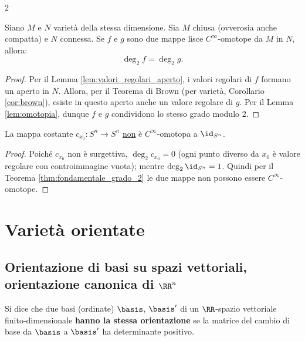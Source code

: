 \begin{multicols*}{2}
    \begin{theorem} \label{thm:fondamentale_grado_2}
        Siano $M$ e $N$ varietà della stessa dimensione. Sia $M$ chiusa (ovverosia
        anche compatta)
        e $N$ connessa. Se $f$ e $g$ sono due mappe lisce $C^\infty$-omotope da $M$ in $N$,
        allora:
        \[
            \boxed{\deg_2 f = \deg_2 g.}
        \]
    \end{theorem}

    \begin{proof}
        Per il Lemma \ref{lem:valori_regolari_aperto}, i valori regolari di $f$ formano un aperto in $N$. Allora, per il Teorema
        di Brown (per varietà, Corollario \ref{cor:brown}), esiste in questo
        aperto anche un valore regolare di $g$. Per il Lemma \ref{lem:omotopia},
        dunque $f$ e $g$ condividono lo stesso grado modulo $2$.
    \end{proof}

    \begin{corollary}
        La mappa costante $c_{x_0} : S^n \to S^n$ \underline{non} è
        $C^\infty$-omotopa a $\id_{S^n}$.
    \end{corollary}

    \begin{proof}
        Poiché $c_{x_0}$ non è surgettiva, $\deg_2 c_{x_0} = 0$ (ogni punto diverso da $x_0$ è
        valore regolare con controimmagine vuota); mentre
        $\deg_2 \id_{S^n} = 1$. Quindi per il Teorema \ref{thm:fondamentale_grado_2}
        le due mappe non possono essere $C^\infty$-omotope.
    \end{proof}

    \section{Varietà orientate}

    \subsection{Orientazione di basi su spazi vettoriali, orientazione canonica di \texorpdfstring{$\RR^n$}{ℝⁿ}}

    \begin{definition}
        Si dice che due basi (ordinate) $\basis$, $\basis'$ di un $\RR$-spazio vettoriale finito-dimensionale
        \textbf{hanno la stessa orientazione} se la matrice del cambio di base da $\basis$
        a $\basis'$ ha determinante positivo.
    \end{definition}


\end{multicols*}
